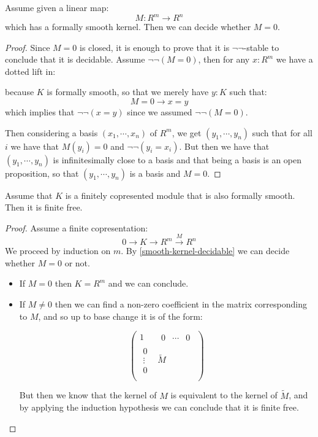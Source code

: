 \begin{lemma}\label{smooth-kernel-decidable}
Assume given a linear map:
\[M:R^m\to R^n\] 
which has a formally smooth kernel. Then we can decide whether $M=0$.
\end{lemma}

\begin{proof}
Since $M=0$ is closed, it is enough to prove that it is $\neg\neg$-stable to conclude that it is decidable. Assume $\neg\neg(M=0)$, then for any $x:R^m$ we have a dotted lift in:
 \begin{center}
\end{center}
because $K$ is formally smooth, so that we merely have $y:K$ such that: 
\[M=0\to x=y\]
which implies that $\neg\neg(x=y)$ since we assumed $\neg\neg(M=0)$.

Then considering a basis $(x_1,\cdots,x_n)$ of $R^m$, we get $(y_1,\cdots,y_n)$ such that for all $i$ we have that $M(y_i) = 0$ and $\neg\neg(y_i=x_i)$. But then we have that $(y_1,\cdots,y_n)$ is infinitesimally close to a basis and that being a basis is an open proposition, so that $(y_1,\cdots,y_n)$ is a basis and $M=0$.
\end{proof}

\begin{lemma}\label{smooth-corpresented-implies-free}
Assume that $K$ is a finitely copresented module that is also formally smooth. Then it is finite free.
\end{lemma}

\begin{proof}
Assume a finite copresentation:
\[0\to K\to R^m\overset{M}{\to} R^n\]
We proceed by induction on $m$. By \cref{smooth-kernel-decidable} we can decide whether $M=0$ or not.
\begin{itemize}
\item If $M=0$ then $K=R^m$ and we can conclude.
\item If $M\not=0$ then we can find a non-zero coefficient in the matrix corresponding to $M$, and so up to base change it is of the form:

\[
\begin{pmatrix}
1 & \begin{matrix}0&\cdots & 0\end{matrix}  \\
\begin{matrix}0\\ \vdots\\ 0\end{matrix} & \widetilde{M} \\
\end{pmatrix}
\]

But then we know that the kernel of $M$ is equivalent to the kernel of $\widetilde{M}$, and by applying the induction hypothesis we can conclude that it is finite free.
\end{itemize}
\end{proof}


